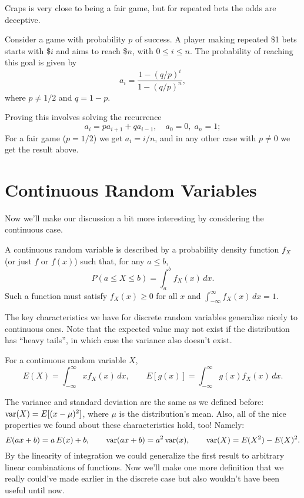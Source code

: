 \documentclass[../m157main.tex]{subfiles}
\begin{document}
Craps is very close to being a fair game, but for repeated bets the odds are deceptive.

\begin{theorem} %
    Consider a game with probability $p$ of success.
    A player making repeated \$1 bets starts with \$$i$ and aims to reach \$$n$, with $0 \leq i \leq n$.
    The probability of reaching this goal is given by
    \[ a_i = \frac{1 - (q / p)^{i}}{1 - (q / p)^{n}}, \]
    where $p \neq 1 / 2$ and $q = 1 - p$.
\end{theorem}

Proving this involves solving the recurrence
\[ a_i = p a_{i+1} + q a_{i-1}, \quad a_0 = 0, \; a_n = 1; \]
For a fair game ($p = 1 / 2$) we get $a_i = i / n$, and in any other case with $p \neq 0$ we get the result above.

\section{Continuous Random Variables}
Now we'll make our discussion a bit more interesting by considering the continuous case.

\begin{definition}
    A continuous random variable is described by a probability density function $f_X$ (or just $f$ or $f(x)$) such that, for any $a \leq b$,
    \[ P(a \leq X \leq b) = \int_{a}^{b} f_X(x) \,dx. \]
    Such a function must satisfy $f_X(x) \geq 0$ for all $x$ and $\int_{-\infty}^{\infty} f_X(x) \,dx = 1$.
\end{definition}

The key characteristics we have for discrete random variables generalize nicely to continuous ones.
Note that the expected value may not exist if the distribution has ``heavy tails'', in which case the variance also doesn't exist.

\begin{definition}
    For a continuous random variable $X$,
    \[ E(X) = \int_{-\infty}^{\infty} x f_X(x) \,dx, \qquad E[g(x)] = \int_{-\infty}^{\infty} g(x) f_X(x) \,dx. \]
\end{definition}

The variance and standard deviation are the same as we defined before: $\operatorname{var}(X) = E[(x-\mu)^2]$, where $\mu$ is the distribution's mean.
Also, all of the nice properties we found about these characteristics hold, too!
Namely:
\[ E(ax + b) = a \,E(x) + b, \qquad \operatorname{var}(ax + b) = a^2 \operatorname{var}(x), \qquad \operatorname{var}(X) = E(X^2) - E(X)^2. \]
By the linearity of integration we could generalize the first result to arbitrary linear combinations of functions.
Now we'll make one more definition that we really could've made earlier in the discrete case but also wouldn't have been useful until now.
\end{document}
